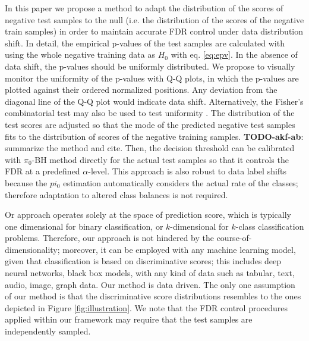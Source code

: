 \documentclass{article}
\newcommand{\todo}[2]{{\color{red} {\bf TODO-#1}: #2}}
\begin{document}


In this paper we propose a method to adapt the distribution of the scores of negative test samples to the null (i.e. the distribution of the scores of the negative train samples) in order to maintain accurate FDR control under data distribution shift. In detail, the empirical p-values of the test samples are calculated with using the whole negative training data as $H_0$ with eq. \ref{eq:epv}. In the absence of data shift, the p-values should be uniformly distributed. We propose to visually monitor the uniformity of the p-values with Q-Q plots, in which the p-values are plotted against their ordered normalized positions. Any deviation from the diagonal line of the Q-Q plot would indicate data shift. Alternatively, the Fisher's combinatorial test may also be used to test uniformity \cite{fisher1928statistical}. The distribution of the test scores are adjusted so that the mode of the predicted negative test samples fits to the distribution of scores of the negative training samples. \todo{akf-ab}{summarize the method and cite}. Then, the decision threshold can be calibrated with $\pi_0$-BH method directly for the actual test samples so that it controls the FDR at a predefined $\alpha$-level. This approach is also robust to data label shifts because the $pi_0$ estimation automatically considers the actual rate of the classes; therefore adaptation to altered class balances is not required.

 Or approach operates solely at the space of prediction score, which is typically one dimensional for binary classification, or $k$-dimensional for $k$-class classification problems. Therefore, our approach is not hindered by the course-of-dimensionality; moreover, it can be employed with any machine learning model, given that classification is based on discriminative scores; this includes deep neural networks, black box models, with any kind of data such as tabular, text, audio, image, graph data. Our method is data driven. The only one assumption of our method is that the discriminative score distributions resembles to the ones depicted in Figure \ref{fig:illustration}. We note that the FDR control procedures applied within our framework may require that the test samples are independently sampled.
\end{document}
